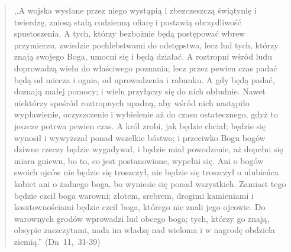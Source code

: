 \documentclass[10pt,a4paper,oneside]{article}
\begin{document}
\begin{quote}
,,A wojska wysłane przez niego wystąpią i zbezczeszczą świątynię i twierdzę, zniosą stałą codzienną ofiarę i postawią obrzydliwość spustoszenia. A tych, którzy bezbożnie będą postępować wbrew przymierzu, zwiedzie pochlebstwami do odstępstwa, lecz lud tych, którzy znają swojego Boga, umocni się i będą działać. A roztropni wśród ludu doprowadzą wielu do właściwego poznania; lecz przez pewien czas padać będą od miecza i ognia, od uprowadzenia i rabunku. A gdy będą padać, doznają małej pomocy; i wielu przyłączy się do nich obłudnie. Nawet niektórzy spośród roztropnych upadną, aby wśród nich nastąpiło wypławienie, oczyszczenie i wybielenie aż do czasu ostatecznego, gdyż to jeszcze potrwa pewien czas. A król zrobi, jak będzie chciał; będzie się wynosił i wywyższał ponad wszelkie bóstwo; i przeciwko Bogu bogów dziwne rzeczy będzie wygadywał, i będzie miał powodzenie, aż dopełni się miara gniewu, bo to, co jest postanowione, wypełni się. Ani o bogów swoich ojców nie będzie się troszczył, nie będzie się troszczył o ulubieńca kobiet ani o żadnego boga, bo wyniesie się ponad wszystkich. Zamiast tego będzie czcił boga warowni; złotem, srebrem, drogimi kamieniami i kosztownościami będzie czcił boga, którego nie znali jego ojcowie. Do warownych grodów wprowadzi lud obcego boga; tych, którzy go znają, obsypie zaszczytami, nada im władzę nad wieloma i w nagrodę obdziela ziemią.'' \mbox{(Dn 11, 31-39)}
\end{quote}
\end{document}
